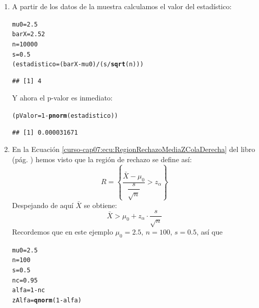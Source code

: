 \documentclass[10pt,a4paper]{article}\usepackage[]{graphicx}\usepackage[]{color}
\makeatletter
\newcommand{\hlnum}[1]{\textcolor[rgb]{0.686,0.059,0.569}{#1}}%
\newcommand{\hlopt}[1]{\textcolor[rgb]{0,0,0}{#1}}%
\newcommand{\hlstd}[1]{\textcolor[rgb]{0.345,0.345,0.345}{#1}}%
\newcommand{\hlkwb}[1]{\textcolor[rgb]{0.69,0.353,0.396}{#1}}%
\newcommand{\hlkwd}[1]{\textcolor[rgb]{0.737,0.353,0.396}{\textbf{#1}}}%
\newenvironment{kframe}{%
 \def\at@end@of@kframe{}%
 \ifinner\ifhmode%
  \def\at@end@of@kframe{\end{minipage}}%
  \begin{minipage}{\columnwidth}%
 \fi\fi%
 \def\FrameCommand##1{\hskip\@totalleftmargin \hskip-\fboxsep
 \colorbox{shadecolor}{##1}\hskip-\fboxsep
     \hskip-\linewidth \hskip-\@totalleftmargin \hskip\columnwidth}%
 \MakeFramed {\advance\hsize-\width
   \@totalleftmargin\z@ \linewidth\hsize
   \@setminipage}}%
 {\par\unskip\endMakeFramed%
 \at@end@of@kframe}
\newenvironment{knitrout}{}{} %
\makeatother
\begin{document}
\begin{enumerate}
  \item A partir de los datos de la muestra calculamos el valor del estadístico:
\begin{knitrout}
\color{fgcolor}\begin{kframe}
\begin{alltt}
\hlstd{mu0} \hlkwb{=} \hlnum{2.5}
\hlstd{barX} \hlkwb{=} \hlnum{2.52}
\hlstd{n} \hlkwb{=} \hlnum{10000}
\hlstd{s} \hlkwb{=} \hlnum{0.5}
\hlstd{(estadistico} \hlkwb{=} \hlstd{(barX} \hlopt{-} \hlstd{mu0)} \hlopt{/} \hlstd{(s}\hlopt{/}\hlkwd{sqrt}\hlstd{(n)))}
\end{alltt}
\begin{verbatim}
## [1] 4
\end{verbatim}
\end{kframe}
\end{knitrout}
    Y ahora el p-valor es inmediato:
\begin{knitrout}
\color{fgcolor}\begin{kframe}
\begin{alltt}
\hlstd{(pValor} \hlkwb{=} \hlnum{1} \hlopt{-} \hlkwd{pnorm}\hlstd{(estadistico))}
\end{alltt}
\begin{verbatim}
## [1] 0.000031671
\end{verbatim}
\end{kframe}
\end{knitrout}

  \item  En la Ecuación \ref{curso-cap07:ecu:RegionRechazoMediaZColaDerecha} del libro (pág. \pageref{curso-cap07:ecu:RegionRechazoMediaZColaDerecha}) hemos visto que la región de rechazo se define así:
  \[R=\left\{\dfrac{\bar X-\mu_0}{\dfrac{s}{\sqrt{n}}} > z_{\alpha}\right\}\]
  Despejando de aquí $\bar X$ se obtiene:
  \[\bar X  > \mu_0 + z_{\alpha}\cdot \dfrac{s}{\sqrt{n}}\]
  Recordemos que en este ejemplo $\mu_0 = 2.5$, $n = 100$, $s = 0.5$, así que
\begin{knitrout}
\color{fgcolor}\begin{kframe}
\begin{alltt}
\hlstd{mu0} \hlkwb{=} \hlnum{2.5}
\hlstd{n} \hlkwb{=} \hlnum{100}
\hlstd{s} \hlkwb{=} \hlnum{0.5}
\hlstd{nc} \hlkwb{=} \hlnum{0.95}
\hlstd{alfa} \hlkwb{=} \hlnum{1} \hlopt{-} \hlstd{nc}
\hlstd{zAlfa} \hlkwb{=} \hlkwd{qnorm}\hlstd{(}\hlnum{1} \hlopt{-} \hlstd{alfa)}


\end{alltt}
\end{kframe}
\end{knitrout}
\end{enumerate}
\end{document}
